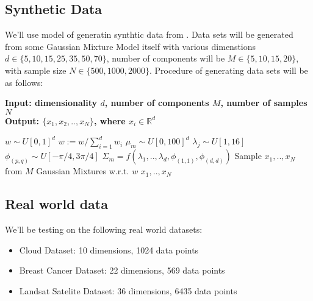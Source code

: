 \documentclass[a4paper]{article}
\begin{document}
\subsection{Synthetic Data}

We'll use model of generatin synthtic data from \cite{ARI20122804}. Data sets will be generated from some Gaussian Mixture Model itself with
 various dimenstions $d \in \{5, 10, 15, 25, 35, 50, 70\}$, number of components will be $M \in \{5, 10, 15, 20\}$, with sample size $N \in \{500, 1000, 2000\}$.
Procedure of generating data sets will be as follows:

\begin{algorithm}
    \caption{}\label{alg:cap}
    \hspace*{\algorithmicindent} \textbf{Input: dimensionality $d$, number of components $M$, number of samples $N$} \\
    \hspace*{\algorithmicindent} \textbf{Output: $\{x_1, x_2, .., x_N\}$, where $x_i \in \mathbb{R}^d$}
    \begin{algorithmic}
        \State $w \sim U[0, 1]^d$
        \State $w := w / \sum_{i=1}^d w_i$
            \State $\mu_m \sim U[0, 100]^d$
                \State $\lambda_j  \sim U[1, 16]$ 
                    \State $\phi_{(p,q)} \sim U[-\pi/4, 3\pi/4]$ 
                \EndFor
                \State
            \State $\Sigma_m = f(\lambda_1, .., \lambda_d, \phi_{(1, 1)}, \phi_{(d, d)})$ 
            \EndFor
            \State Sample $x_1, .., x_N$ from $M$ Gaussian Mixtures w.r.t. $w$ 
        \EndFor 
        \State \Return $x_1, .., x_N$
    \end{algorithmic}
\end{algorithm}

\subsection{Real world data}
We'll be testing on the following real world datasets:

\begin{itemize}
    \item Cloud Dataset: 10 dimensions, 1024 data points
    \item Breast Cancer Dataset: 22 dimensions, 569 data points
    \item Landsat Satelite Dataset: 36 dimensions, 6435 data points
\end{itemize}
\end{document}
